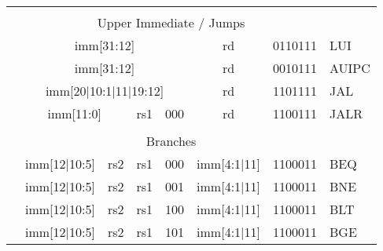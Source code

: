 \begin{table}[p]
\begin{small}
\begin{center}
\begin{tabular}{ccccccp{0.3in}p{0.3in}p{0.3in}cp{0.6in}l}
&
\multicolumn{10}{c}{} & \\

&
\multicolumn{10}{c}{Upper Immediate / Jumps} & \\

\cline{2-11}
  

&
\multicolumn{8}{|c|}{imm[31:12]} &
\multicolumn{1}{c|}{rd} &
\multicolumn{1}{c|}{0110111} & LUI \\
\cline{2-11}
  

&
\multicolumn{8}{|c|}{imm[31:12]} &
\multicolumn{1}{c|}{rd} &
\multicolumn{1}{c|}{0010111} & AUIPC \\
\cline{2-11}

&
\multicolumn{8}{|c|}{imm[20$\vert$10:1$\vert$11$\vert$19:12]} &
\multicolumn{1}{c|}{rd} &
\multicolumn{1}{c|}{1101111} & JAL \\
\cline{2-11}
  

&
\multicolumn{6}{|c|}{imm[11:0]} &
\multicolumn{1}{c|}{rs1} &
\multicolumn{1}{c|}{000} &
\multicolumn{1}{c|}{rd} &
\multicolumn{1}{c|}{1100111} & JALR \\
\cline{2-11}

&
\multicolumn{10}{c}{} & \\

&
\multicolumn{10}{c}{Branches} & \\

\cline{2-11}
  

&
\multicolumn{4}{|c|}{imm[12$\vert$10:5]} &
\multicolumn{2}{c|}{rs2} &
\multicolumn{1}{c|}{rs1} &
\multicolumn{1}{c|}{000} &
\multicolumn{1}{c|}{imm[4:1$\vert$11]} &
\multicolumn{1}{c|}{1100011} & BEQ \\
\cline{2-11}
  

&
\multicolumn{4}{|c|}{imm[12$\vert$10:5]} &
\multicolumn{2}{c|}{rs2} &
\multicolumn{1}{c|}{rs1} &
\multicolumn{1}{c|}{001} &
\multicolumn{1}{c|}{imm[4:1$\vert$11]} &
\multicolumn{1}{c|}{1100011} & BNE \\
\cline{2-11}
  

&
\multicolumn{4}{|c|}{imm[12$\vert$10:5]} &
\multicolumn{2}{c|}{rs2} &
\multicolumn{1}{c|}{rs1} &
\multicolumn{1}{c|}{100} &
\multicolumn{1}{c|}{imm[4:1$\vert$11]} &
\multicolumn{1}{c|}{1100011} & BLT \\
\cline{2-11}
  

&
\multicolumn{4}{|c|}{imm[12$\vert$10:5]} &
\multicolumn{2}{c|}{rs2} &
\multicolumn{1}{c|}{rs1} &
\multicolumn{1}{c|}{101} &
\multicolumn{1}{c|}{imm[4:1$\vert$11]} &
\multicolumn{1}{c|}{1100011} & BGE \\
\cline{2-11}
  


\end{tabular}
\end{center}
\end{small}
\end{table}
